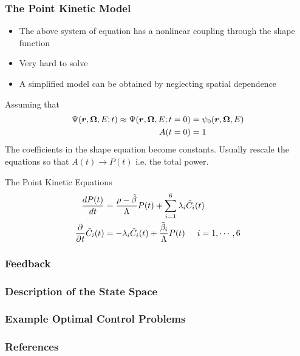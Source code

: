 \documentclass[10pt,compress]{beamer}
\begin{document}
\begin{frame}\frametitle{The Point Kinetic Model}
    \begin{itemize}
        \item The above system of equation has a nonlinear coupling through the shape function
        \item Very hard to solve
        \item A simplified model can be obtained by neglecting spatial dependence
    \end{itemize}
    Assuming that
    \begin{equation}
        \begin{split}
            \Psi(\boldsymbol{r}, \boldsymbol{\Omega}, E;t) \approx \Psi(\boldsymbol{r}, \boldsymbol{\Omega}, E;t=0) &= \psi_0(\boldsymbol{r}, \boldsymbol{\Omega}, E)\nonumber\\
            A(t=0)&=1
        \end{split}
    \end{equation}
    The coefficients in the shape equation become constants. Usually rescale the equations so that $A(t)\to P(t)$ i.e. the total power.
    \begin{block}{The Point Kinetic Equations}
        \begin{equation}
            \begin{split}
                \frac{dP(t)}{dt} &= \frac{\rho- \tilde{\beta}}{\Lambda}P(t) + \sum_{i=1}^6\lambda_i \tilde{C}_i(t)\nonumber\\
                \frac{\partial^{} }{\partial^{} t}\tilde{C}_i(t) &= -\lambda_i \tilde{C}_i(t) + \frac{\tilde{\beta}_i}{\Lambda}P(t)\hspace{5mm} i=1,\cdots, 6
            \end{split}
        \end{equation}
    \end{block}
\end{frame}

\begin{frame}\frametitle{Feedback}

\end{frame}

\begin{frame}\frametitle{Description of the State Space}

\end{frame}

\begin{frame}\frametitle{Example Optimal Control Problems}

\end{frame}

\begin{frame}\frametitle{References}

\end{frame}
\end{document}
